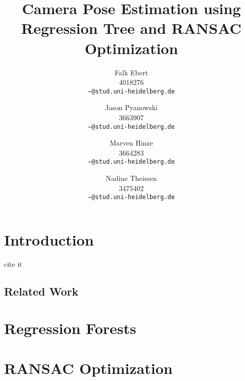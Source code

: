 \documentclass[final]{cvpr}
\begin{document}
\title{Camera Pose Estimation using Regression Tree and RANSAC Optimization}

\author{Falk Ebert\\
4018276\\
{\tt\small ---@stud.uni-heidelberg.de}
\and
Jason Pyanowski\\
3663907\\
{\tt\small ---@stud.uni-heidelberg.de}
\and
Marven Hinze\\
3664283\\
{\tt\small ---@stud.uni-heidelberg.de}
\and
Nadine Theissen\\
3475402\\
{\tt\small ---@stud.uni-heidelberg.de}
}

\maketitle


\begin{abstract}
   
\end{abstract}

\section{Introduction}
cite it~\cite{shotton2013}

\subsection{Related Work}

\section{Regression Forests}

\section{RANSAC Optimization}
\end{document}

